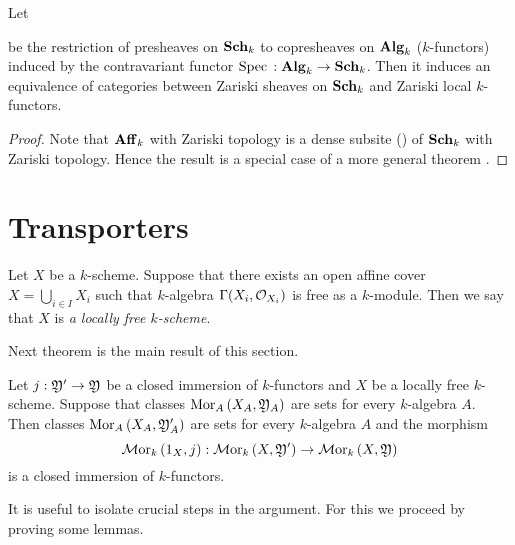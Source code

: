 \begin{theorem}\label{theorem:sheavesonschemesarelocalkfunctors}
Let
\begin{center}
\end{center}
be the restriction of presheaves on $\mathbf{Sch}_k$ to copresheaves on $\mathbf{Alg}_k$ ($k$-functors) induced by the contravariant functor $\mathrm{Spec}\,:\mathbf{Alg}_k\rightarrow \mathbf{Sch}_k$. Then it induces an equivalence of categories between Zariski sheaves on $\mathbf{Sch}_k$ and Zariski local $k$-functors.
\end{theorem}
\begin{proof}
Note that $\mathbf{Aff}_k$ with Zariski topology is a dense subsite ({\cite[definition 4.4]{Sheaves}}) of $\mathbf{Sch}_k$ with Zariski topology. Hence the result is a special case of a more general theorem {\cite[Theorem 4.6]{Sheaves}}. 
\end{proof}

\section{Transporters}

\begin{definition}
Let $X$ be a $k$-scheme. Suppose that there exists an open affine cover $X = \bigcup_{i\in I}X_i$ such that $k$-algebra $\Gamma(X_i,{\mathcal O}_{X_i})$ is free as a $k$-module. Then we say that $X$ is \textit{a locally free $k$-scheme}.
\end{definition}
\noindent
Next theorem is the main result of this section.

\begin{theorem}\label{theorem:closedimmersionsandinternalhom}
Let $j:{\mathfrak Y}'\rightarrow {\mathfrak Y}$ be a closed immersion of $k$-functors and $X$ be a locally free $k$-scheme. Suppose that classes $\mathrm{Mor}_A\left(X_A,{\mathfrak Y}_A\right)$ are sets for every $k$-algebra $A$. Then classes $\mathrm{Mor}_A\left(X_A,{\mathfrak Y}'_A\right)$ are sets for every $k$-algebra $A$ and the morphism
$$\mathcal{M}\mathrm{or}_k\left(1_X,j\right):\mathcal{M}\mathrm{or}_k\left(X,{\mathfrak Y}'\right)\rightarrow \mathcal{M}\mathrm{or}_k\left(X,{\mathfrak Y}\right)$$
is a closed immersion of $k$-functors.
\end{theorem}
\noindent
It is useful to isolate crucial steps in the argument. For this we proceed by proving some lemmas.

